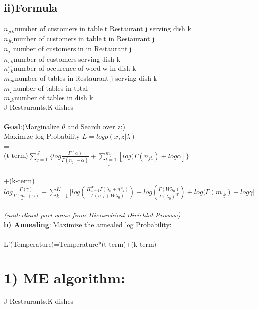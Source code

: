 \documentclass{article}
\begin{document}
\begin{spacing}{1.1}
\subsection{ii)Formula}
$n_{jtk}$number of customers in table t Restaurant j serving dish k \\
$n_{jt.}$number of customers in table t in Restaurant j \\
$n_{j..}$number of customers in in Restaurant j \\
$n_{..k}$number of customers serving dish k \\
$n_{..k}^{w}$number of occurence of word w in dish k \\
$m_{jk}$number of tables in Restaurant j serving dish k\\
$m_{..}$number of tables in total \\
$m_{.k}$number of tables in dish k \\
J Restaurants,K dishes\\ \\
{\bf Goal}:(Marginalize $\theta$ and Search over z:)\\
 Maximize log Probability $L=log p(x,z|\lambda)$\\ =\\
(t-term)$ \underline{\sum_{j=1}^{J} \{log \frac{\Gamma(\alpha)}{\Gamma(n_{j..}+\alpha)}+\sum_{t=1}^{m_{j.}}[log(\Gamma(n_{jt.})+log \alpha
]\}}$\\ \\
+(k-term)$ \underline{log \frac{\Gamma(\gamma)}{\Gamma(m_{..}+\gamma)}}+\sum_{k=1}^{K} [log(\frac{\Pi_{w=1}^{W}\Gamma(\lambda_{0}+n_{..k}^{w})}{\Gamma(n_{..k}+W\lambda_{0})})+log(\frac{\Gamma(W\lambda_{0})}{\Gamma(\lambda_{0})^{W}})
+\underline{log(\Gamma(m_{.k})+log \gamma]}$\\ \\ \emph{{\small (underlined part come from Hierarchical Dirichlet Process)}}\\ 
{\bf b) Annealing}: Maximize the annealed log Probability:\\ \\
L'(Temperature)=Temperature*(t-term)+(k-term)



\section{1) ME algorithm: }
J Restaurants,K dishes

\end{spacing}
\end{document}
